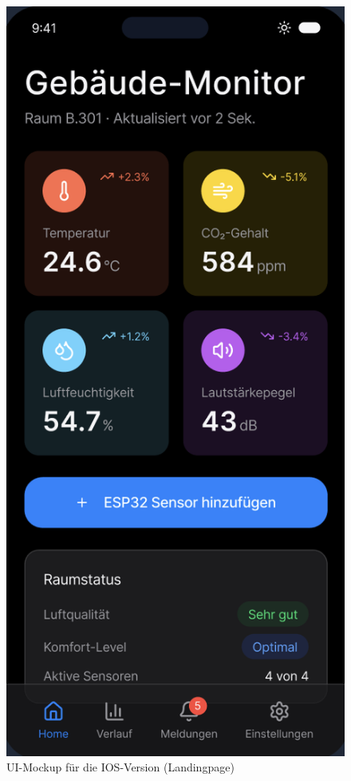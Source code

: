 \documentclass{article}
\begin{document}
\begin{figure}[H]
  \centering
  \includegraphics[width=\textwidth, height=0.9\textheight, keepaspectratio]{UI_Mockup_IOS.png}
  \caption{UI-Mockup für die IOS-Version (Landingpage)}
  \label{fig:ui-mockup-ios}
\end{figure}
\end{document}
